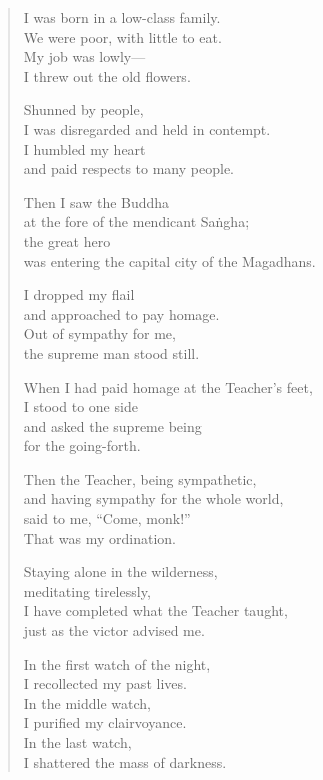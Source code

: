 \documentclass[12pt,openany]{book}%
\begin{document}
\begin{verse}%
I was born in a low-class family. \\
We were poor, with little to eat. \\
My job was lowly—\\
I threw out the old flowers. 

Shunned by people, \\
I was disregarded and held in contempt. \\
I humbled my heart \\
and paid respects to many people. 

Then I saw the Buddha \\
at the fore of the mendicant \textsanskrit{Saṅgha}; \\
the great hero \\
was entering the capital city of the Magadhans. 

I dropped my flail \\
and approached to pay homage. \\
Out of sympathy for me, \\
the supreme man stood still. 

When I had paid homage at the Teacher’s feet, \\
I stood to one side \\
and asked the supreme being \\
for the going-forth. 

Then the Teacher, being sympathetic, \\
and having sympathy for the whole world, \\
said to me, “Come, monk!” \\
That was my ordination. 

Staying alone in the wilderness, \\
meditating tirelessly, \\
I have completed what the Teacher taught, \\
just as the victor advised me. 

In the first watch of the night, \\
I recollected my past lives. \\
In the middle watch, \\
I purified my clairvoyance. \\
In the last watch, \\
I shattered the mass of darkness. 


\end{verse}
\end{document}
